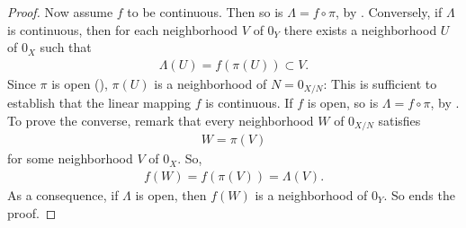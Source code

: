 \begin{proof}
Now assume $f$ to be continuous. Then so is 
%
  $\Lambda = f\circ \pi $, 
% 
by . 
%
Conversely, 
%
if $\Lambda$ is continuous, then for each neighborhood $V$ of $0_Y$ 
there exists a neighborhood $U$ of $0_X$ such that
%
  \begin{align}
    \Lambda(U) = f\left(\pi(U)\right) 
      \subset 
    V.
  \end{align}
%
Since $\pi$ is open (), $\pi(U)$ is a neighborhood of 
%
  $N=0_{X/N}$: 
This is sufficient to establish that the linear mapping $f$ is continuous.
%
If $f$ is open, so is $\Lambda = f\circ \pi$, by . 
%
To prove the converse, remark that 
%
  every neighborhood $W$ of $0_{X/N}$ satisfies %
%
  \begin{align}
    W = \pi(V)
  \end{align}
%
for some neighborhood $V$ of $0_X$. So, 
%
  \begin{align}
    f(W) = f \left(\pi(V)\right) = \Lambda(V).
  \end{align}
%
As a consequence, 
% 
  if $\Lambda$ is open, then $f(W)$ is a neighborhood of $0_Y$. %
%
So ends the proof.
\end{proof}


